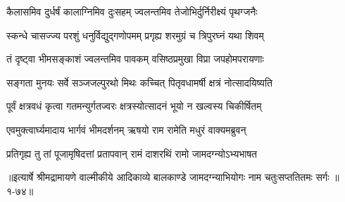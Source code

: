 \twolineshloka
{कैलासमिव दुर्धर्षं कालाग्निमिव दुःसहम्}
{ज्वलन्तमिव तेजोभिर्दुर्निरीक्ष्यं पृथग्जनैः} %

\twolineshloka
{स्कन्धे चासज्ज्य परशुं धनुर्विद्युद्गणोपमम्}
{प्रगृह्य शरमुग्रं च त्रिपुरघ्नं यथा शिवम्} %

\twolineshloka
{तं दृष्ट्वा भीमसङ्काशं ज्वलन्तमिव पावकम्}
{वसिष्ठप्रमुखा विप्रा जपहोमपरायणाः} %

\twolineshloka
{सङ्गता मुनयः सर्वे सञ्जजल्पुरथो मिथः}
{कच्चित् पितृवधामर्षी क्षत्रं नोत्सादयिष्यति} %

\twolineshloka
{पूर्वं क्षत्रवधं कृत्वा गतमन्युर्गतज्वरः}
{क्षत्रस्योत्सादनं भूयो न खल्वस्य चिकीर्षितम्} %

\twolineshloka
{एवमुक्त्वार्घ्यमादाय भार्गवं भीमदर्शनम्}
{ऋषयो राम रामेति मधुरं वाक्यमब्रुवन्} %

\twolineshloka
{प्रतिगृह्य तु तां पूजामृषिदत्तां प्रतापवान्}
{रामं दाशरथिं रामो जामदग्न्योऽभ्यभाषत} %


॥इत्यार्षे श्रीमद्रामायणे वाल्मीकीये आदिकाव्ये बालकाण्डे जामदग्न्याभियोगः नाम चतुःसप्ततितमः सर्गः ॥१-७४॥
